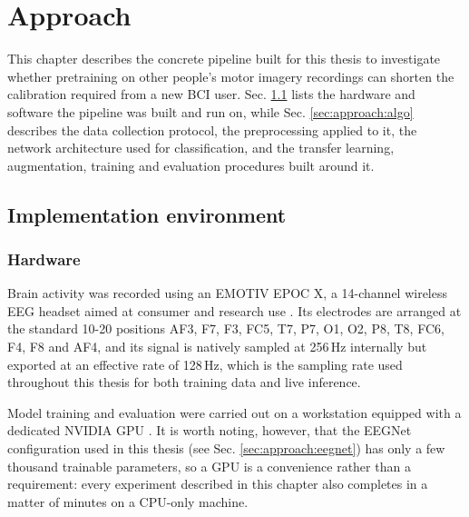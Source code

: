 \chapter{Approach}
\label{chap:approach}

This chapter describes the concrete pipeline built for this thesis to investigate whether pretraining on other people's motor imagery recordings can shorten the calibration required from a new BCI user. Sec. \ref{sec:approach:env} lists the hardware and software the pipeline was built and run on, while Sec. \ref{sec:approach:algo} describes the data collection protocol, the preprocessing applied to it, the network architecture used for classification, and the transfer learning, augmentation, training and evaluation procedures built around it.

\section{Implementation environment}
\label{sec:approach:env}

\subsection{Hardware}
\label{sec:approach:hardware}

Brain activity was recorded using an EMOTIV EPOC X, a 14-channel wireless EEG headset aimed at consumer and research use \cite{EMOTIV:EpocX}. Its electrodes are arranged at the standard 10-20 positions AF3, F7, F3, FC5, T7, P7, O1, O2, P8, T8, FC6, F4, F8 and AF4, and its signal is natively sampled at 256\,Hz internally but exported at an effective rate of 128\,Hz, which is the sampling rate used throughout this thesis for both training data and live inference.

Model training and evaluation were carried out on a workstation equipped with a dedicated NVIDIA GPU . It is worth noting, however, that the EEGNet configuration used in this thesis (see Sec. \ref{sec:approach:eegnet}) has only a few thousand trainable parameters, so a GPU is a convenience rather than a requirement: every experiment described in this chapter also completes in a matter of minutes on a CPU-only machine.

